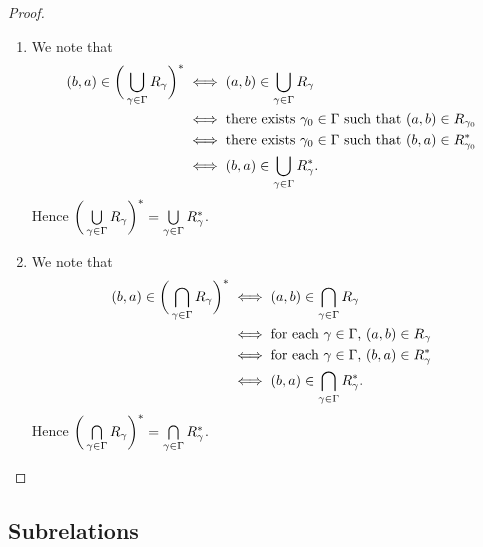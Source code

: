 \begin{proof}\
	\begin{enumerate}
		\item We note that
		\begin{align*}
			(b,a) \in \bigg( \bigcup\limits_{\gamma \in \Gamma} R_{\gamma} \bigg)^*
			& \iff (a,b) \in \bigcup\limits_{\gamma \in \Gamma} R_{\gamma} \\
			& \iff \text{there exists $\gamma_0 \in \Gamma$ such that $(a,b) \in R_{\gamma_0}$} \\
			& \iff \text{there exists $\gamma_0 \in \Gamma$ such that $(b,a) \in R_{\gamma_0}^*$} \\
			& \iff (b,a) \in \bigcup\limits_{\gamma \in \Gamma} R_{\gamma}^*.
		\end{align*}
		Hence $\bigg( \bigcup\limits_{\gamma \in \Gamma} R_{\gamma} \bigg)^* = \bigcup\limits_{\gamma \in \Gamma} R_{\gamma}^*$.
		\item We note that
		\begin{align*}
			(b,a) \in \bigg( \bigcap\limits_{\gamma \in \Gamma} R_{\gamma} \bigg)^*
			& \iff (a,b) \in \bigcap\limits_{\gamma \in \Gamma} R_{\gamma} \\
			& \iff \text{for each $\gamma \in \Gamma$, $(a,b) \in R_{\gamma}$} \\
			& \iff \text{for each $\gamma \in \Gamma$, $(b,a) \in R_{\gamma}^*$} \\
			& \iff (b,a) \in \bigcap\limits_{\gamma \in \Gamma} R_{\gamma}^*.
		\end{align*}
		Hence $\bigg( \bigcap\limits_{\gamma \in \Gamma} R_{\gamma} \bigg)^* = \bigcap\limits_{\gamma \in \Gamma} R_{\gamma}^*$.
	\end{enumerate}
\end{proof}

































\subsection{Subrelations}

